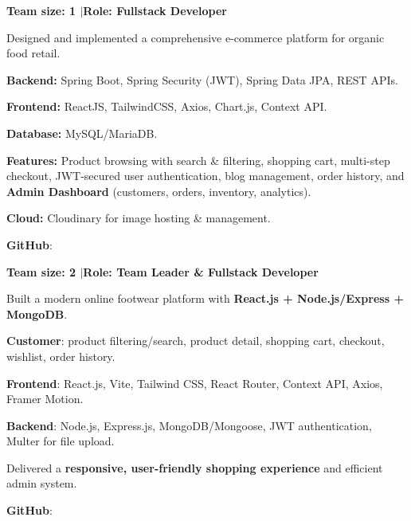 
\textbf{Team size: 1 \enspace$\vert$\enspace Role: Fullstack Developer}

\begin{entryItems}
    \item Designed and implemented a comprehensive e-commerce platform for organic food retail.
    \item \textbf{Backend:} Spring Boot, Spring Security (JWT), Spring Data JPA, REST APIs.
    \item \textbf{Frontend:} ReactJS, TailwindCSS, Axios, Chart.js, Context API.
    \item \textbf{Database:} MySQL/MariaDB.
    \item \textbf{Features:} Product browsing with search \& filtering, shopping cart, multi-step checkout, JWT-secured user authentication, blog management, order history, and \textbf{Admin Dashboard} (customers, orders, inventory, analytics).
    \item \textbf{Cloud:} Cloudinary for image hosting \& management.
    \item \textbf{GitHub}: 
\end{entryItems}


\textbf{Team size: 2 \enspace$\vert$\enspace Role: Team Leader \& Fullstack Developer}

\begin{entryItems}
    \item Built a modern online footwear platform with \textbf{React.js + Node.js/Express + MongoDB}.
    \item \textbf{Customer}: product filtering/search, product detail, shopping cart, checkout, wishlist, order history.
    \item \textbf{Frontend}: React.js, Vite, Tailwind CSS, React Router, Context API, Axios, Framer Motion.
    \item \textbf{Backend}: Node.js, Express.js, MongoDB/Mongoose, JWT authentication, Multer for file upload.
    \item Delivered a \textbf{responsive, user-friendly shopping experience} and efficient admin system.
    \item \textbf{GitHub}: 
\end{entryItems}

